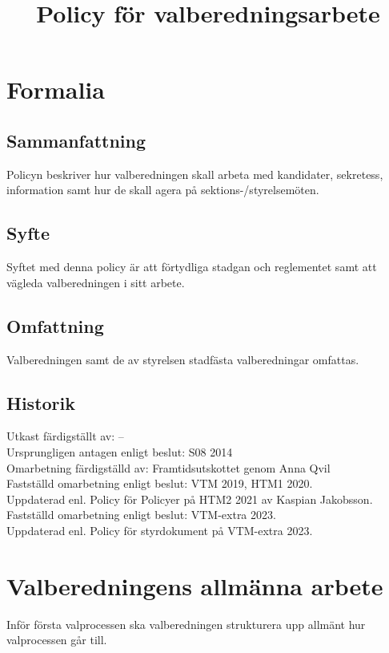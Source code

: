 \documentclass{dsekprotokoll}
\title{Policy för valberedningsarbete}
\author{}
\begin{document}
\maketitle

\section{Formalia}
\subsection{Sammanfattning}
Policyn beskriver hur valberedningen skall arbeta med kandidater, sekretess, information samt
hur de skall agera på sektions-/styrelsemöten.

\subsection{Syfte}
Syftet med denna policy är att förtydliga stadgan och reglementet samt att vägleda valberedningen i sitt arbete.

\subsection{Omfattning}
Valberedningen samt de av styrelsen stadfästa valberedningar omfattas.

\subsection{Historik}
Utkast färdigställt av: – \\
Ursprungligen antagen enligt beslut: S08 2014\\
Omarbetning färdigställd av: Framtidsutskottet genom Anna Qvil\\
Fastställd omarbetning enligt beslut: VTM 2019, HTM1 2020. \\
Uppdaterad enl. Policy för Policyer på HTM2 2021 av Kaspian Jakobsson.\\
Fastställd omarbetning enligt beslut: VTM-extra 2023.\\
Uppdaterad enl. Policy för styrdokument på VTM-extra 2023.


\section{Valberedningens allmänna arbete}

Inför första valprocessen ska valberedningen strukturera upp allmänt hur valprocessen går till.
\end{document}
